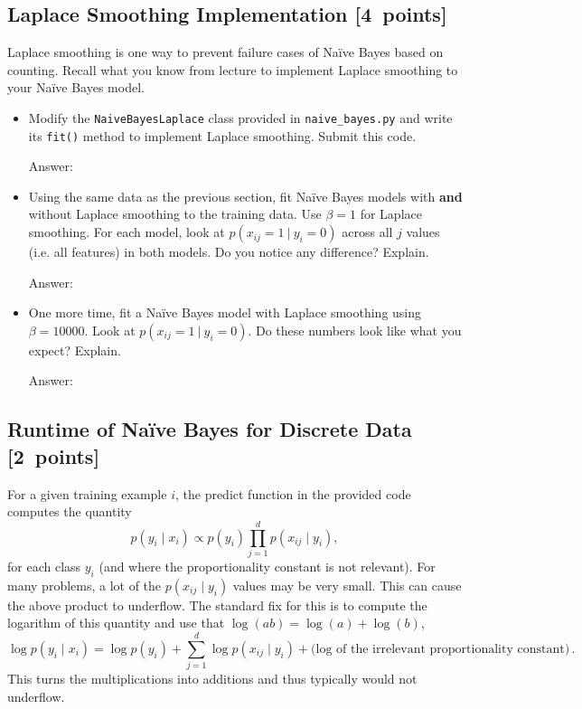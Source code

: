 \documentclass{article}
\newcommand{\blu}[1]{{\textcolor{blu}{#1}}}
\newenvironment{answer}{\par\begingroup\color{gre}Answer: }{\endgroup}
\let\ask\blu
\newcommand\pts[1]{\textcolor{pointscolour}{[#1~points]}}
\begin{document}
    \subsection{Laplace Smoothing Implementation \pts{4}}

    Laplace smoothing is one way to prevent failure cases of Na\"ive Bayes based on counting. Recall what you know from lecture to implement Laplace smoothing to your Na\"ive Bayes model.
    \begin{itemize}
        \item Modify the \texttt{NaiveBayesLaplace} class provided in \texttt{naive\_bayes.py} and write its \texttt{fit()} method to implement Laplace smoothing. \ask{Submit this code.}
        \begin{answer}

        \end{answer}
        \item Using the same data as the previous section, fit Na\"ive Bayes models with \textbf{and} without Laplace smoothing to the training data. Use $\beta=1$ for Laplace smoothing. For each model, look at $p(x_{ij} = 1 \ | \ y_i = 0)$ across all $j$ values (i.e. all features) in both models. \ask{Do you notice any difference? Explain.}
        \begin{answer}

        \end{answer}
        \item One more time, fit a Na\"ive Bayes model with Laplace smoothing using $\beta=10000$. Look at $p(x_{ij} = 1 \ | \ y_i = 0)$. \ask{Do these numbers look like what you expect? Explain.}
        \begin{answer}

        \end{answer}
    \end{itemize}

    \clearpage
    \subsection{Runtime of Na\"ive Bayes for Discrete Data \pts{2}}

    For a given training example $i$, the predict function in the provided code computes the quantity
    \[
    p(y_i \mid x_i) \propto p(y_i)\prod_{j=1}^d p(x_{ij} \mid y_i),
    \]
    for each class $y_i$ (and where the proportionality constant is not relevant). For many problems, a lot of the $p(x_{ij} \mid y_i)$ values may be very small. This can cause the above product to underflow. The standard fix for this is to compute the logarithm of this quantity and use that $\log(ab) = \log(a)+\log(b)$,
    \[
    \log p(y_i \mid x_i) = \log p(y_i) + \sum_{j=1}^d \log p(x_{ij} \mid y_i) + \text{(log of the irrelevant proportionality constant)} \, .
    \]
    This turns the multiplications into additions and thus typically would not underflow.
\end{document}
